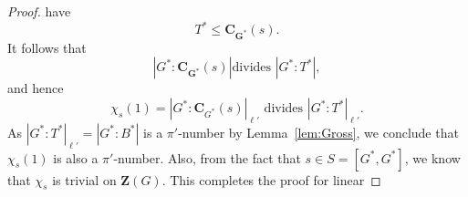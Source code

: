 \documentclass[12pt]{amsart}
\theoremstyle{definition}
\numberwithin{equation}{section}
\newcommand{\bC}{{\mathbf{C}}}
\newcommand{\bG}{{\mathbf{G}}}
\newcommand{\bZ}{{\mathbf{Z}}}
\begin{document}
\begin{proof}
have \[T^*\le
\bC_{\bG^*}(s).\] It follows that \[|G^*:\bC_{\bG^*}(s)| \text{
divides } |G^*:T^*|,\] and hence
\[
\chi_s(1)=|G^*:\bC_{G^*}(s)|_{\ell'} \text{ divides }
|G^*:T^*|_{\ell'}.
\]
As %
$|G^*:T^*|_{\ell'}=|G^*:B^*|$ is a $\pi'$-number %
by
Lemma~\ref{lem:Gross}, we %
conclude that $\chi_s(1)$ is also a
$\pi'$-number. Also, from the fact that $s\in S=[G^*,G^*]$, we know
that $\chi_{s}$ is trivial %
on $\bZ({G})$. %
This completes the proof
for linear %

\end{proof}
\end{document}
